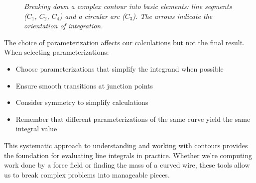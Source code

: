 \begin{figure}[H]
\centering
{}
\caption{\textit{Breaking down a complex contour into basic elements: line segments ($C_1$, $C_2$, $C_4$) and a circular arc ($C_3$). The arrows indicate the orientation of integration.}}
\label{fig:complex_contour}
\end{figure}

\noindent The choice of parameterization affects our calculations but not the final result. When selecting parameterizations:

\begin{itemize}
    \item Choose parameterizations that simplify the integrand when possible
    \item Ensure smooth transitions at junction points
    \item Consider symmetry to simplify calculations
    \item Remember that different parameterizations of the same curve yield the same integral value
\end{itemize}

\noindent This systematic approach to understanding and working with contours provides the foundation for evaluating line integrals in practice. Whether we're computing work done by a force field or finding the mass of a curved wire, these tools allow us to break complex problems into manageable pieces.



